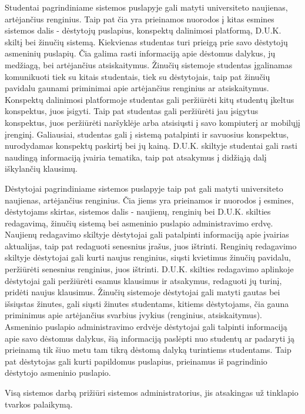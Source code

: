 \documentclass{VUMIFPSkursinis}
\begin{document}
Studentai pagrindiniame sistemos puslapyje gali matyti universiteto naujienas, artėjančius renginius. Taip pat čia yra prieinamos nuorodos į kitas esmines sistemos dalis - dėstytojų puslapius, konspektų dalinimosi platformą, D.U.K. skiltį bei žinučių sistemą. Kiekvienas studentas turi prieigą prie savo dėstytojų asmeninių puslapių. Čia galima rasti informaciją apie dėstomus dalykus, jų medžiagą, bei artėjančius atsiskaitymus. Žinučių sistemoje studentas įgalinamas komunikuoti tiek su kitais studentais, tiek su dėstytojais, taip pat žinučių pavidalu gaunami priminimai apie artėjančius renginius ar atsiskaitymus. Konspektų dalinimosi platformoje studentas gali peržiūrėti kitų studentų įkeltus konspektus, juos įsigyti. Taip pat studentas gali peržiūrėti jau įsigytus konspektus, juos peržiūrėti naršyklėje arba atsisiųsti į savo kompiuterį ar mobilųjį įrenginį. Galiausiai, studentas gali į sistemą patalpinti ir savuosius konspektus, nurodydamas konspektų paskirtį bei jų kainą. D.U.K. skiltyje studentai gali rasti naudingą informaciją įvairia tematika, taip pat atsakymus į didžiąją dalį iškylančių klausimų.

Dėstytojai pagrindiniame sistemos puslapyje taip pat gali matyti universiteto naujienas, artėjančius renginius. Čia jiems yra prieinamos ir nuorodos į esmines, dėstytojams skirtas, sistemos dalis - naujienų, renginių bei D.U.K. skilties redagavimą, žinučių sistemą bei asmeninio puslapio administravimo erdvę. Naujienų redagavimo skiltyje dėstytojai gali patalpinti informaciją apie įvairias aktualijas, taip pat redaguoti senesnius įrašus, juos ištrinti. Renginių redagavimo skiltyje dėstytojai gali kurti naujus renginius, siųsti kvietimus žinučių pavidalu, peržiūrėti senesnius renginius, juos ištrinti. D.U.K. skilties redagavimo aplinkoje dėstytojai gali peržiūrėti esamus klausimus ir atsakymus, redaguoti jų turinį, pridėti naujus klausimus. Žinučių sistemoje dėstytojai gali matyti gautas bei išsiųstas žinutes, gali siųsti žinutes studentams, kitiems dėstytojams, čia gauna priminimus apie artėjančius svarbius įvykius (renginius, atsiskaitymus). Asmeninio puslapio administravimo erdvėje dėstytojai gali talpinti informaciją apie savo dėstomus dalykus, šią informaciją paslėpti nuo studentų ar padaryti ją prieinamą tik šiuo metu tam tikrą dėstomą dalyką turintiems studentams. Taip pat dėstytojas gali kurti papildomus puslapius, prieinamus iš pagrindinio dėstytojo asmeninio puslapio.

Visą sistemos darbą prižiūri sistemos administratorius, jis atsakingas už tinklapio tvarkos palaikymą.
\end{document}
